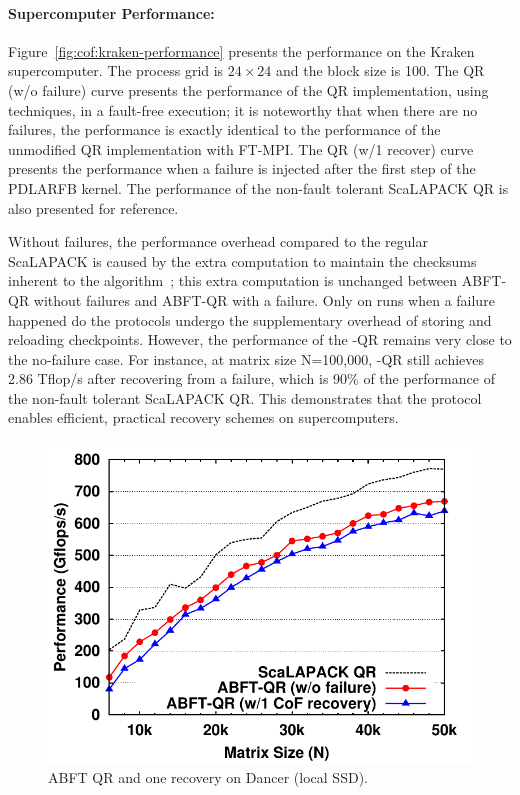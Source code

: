 \paragraph*{Supercomputer Performance:} Figure~\ref{fig:cof:kraken-performance}
presents the performance on the Kraken supercomputer. The process grid is $24
\times 24$ and the block size is 100. The \abft QR (w/o failure) curve presents 
the performance of the \abft QR implementation, using \cof techniques, in a 
fault-free execution; it is noteworthy that when there are no failures, the 
performance is exactly identical to the performance of the unmodified \abft QR 
implementation with FT-MPI. The \abft QR (w/1 \cof recover) curve presents the 
performance when a failure is injected after the first step of the PDLARFB 
kernel. The performance of the non-fault tolerant ScaLAPACK QR is also presented 
for reference.

Without failures, the performance overhead compared to the regular ScaLAPACK is
caused by the extra computation to maintain the checksums inherent to the \abft
algorithm~\cite{pengduppopp12}; this extra computation is unchanged between
ABFT-QR without failures and ABFT-QR with a failure. Only on runs when a failure happened do the \cof protocols
undergo the supplementary overhead of storing and reloading checkpoints.
However, the performance of the \cof-QR remains very close to the no-failure
case. For instance, at matrix size N=100,000, \cof-QR still achieves 2.86
Tflop/s after recovering from a failure, which is 90\% of the performance of the
non-fault tolerant ScaLAPACK QR. This demonstrates that the \cof protocol
enables efficient, practical recovery schemes on supercomputers.

\begin{figure}[t]
	\centering
    \includegraphics[width=.8\linewidth]{figures/dancer-performance-data}
    \caption{ABFT QR and one \cof recovery on Dancer (local SSD).}    	\label{fig:cof:dancer-performance}
\end{figure}


